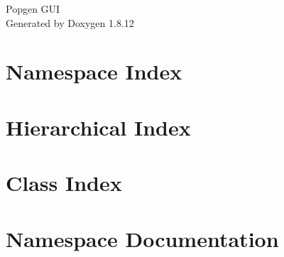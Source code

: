 \documentclass[twoside]{book}
\newcommand{\+}{\discretionary{\mbox{\scriptsize$\hookleftarrow$}}{}{}}
\newcommand{\clearemptydoublepage}{%
  \newpage{\pagestyle{empty}\cleardoublepage}%
}
\begin{document}
\hypersetup{pageanchor=false,
             bookmarksnumbered=true,
             pdfencoding=unicode
            }
\begin{titlepage}
\vspace*{7cm}
\begin{center}%
{\Large Popgen G\+UI }\\
\vspace*{1cm}
{\large Generated by Doxygen 1.8.12}\\
\end{center}
\end{titlepage}
\clearemptydoublepage
{}
\tableofcontents
\clearemptydoublepage
{}
\hypersetup{pageanchor=true}

\chapter{Namespace Index}

\chapter{Hierarchical Index}

\chapter{Class Index}

\chapter{Namespace Documentation}






















\end{document}
